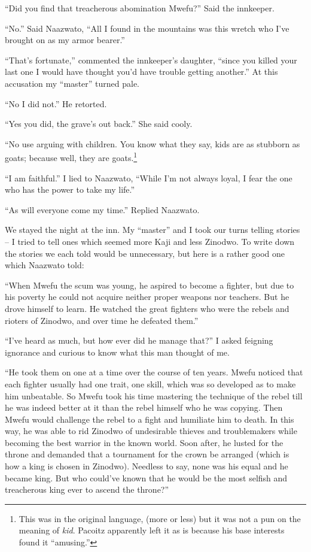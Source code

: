 ``Did you find that treacherous abomination Mwe\-fu?'' Said the innkeeper.

``No.'' Said Naa\-zwa\-to, ``All I found in the mountains was this wretch who I've brought on as my armor bearer.''

``That's fortunate,'' commented the innkeeper's daughter, ``since you killed your last one I would have thought you'd have trouble getting another.'' At this accusation my ``master'' turned pale.

``No I did not.'' He retorted.

``Yes you did, the grave's out back.'' She said cooly.

``No use arguing with children. You know what they say, kids are as stubborn as goats; because well, they are goats.\footnote{This was in the original language, (more or less) but it was not a pun on the meaning of \emph{kid}. Pa\-co\-itz apparently left it as is because his base interests found it ``amusing.''}

``I am faithful.'' I lied to Naa\-zwa\-to, ``While I'm not always loyal, I fear the one who has the power to take my life.''

``As will everyone come my time.'' Replied Naa\-zwa\-to.

We stayed the night at the inn. My ``master'' and I took our turns telling stories -- I tried to tell ones which seemed more Ka\-ji and less Zi\-no\-dwo. To write down the stories we each told would be unnecessary, but here is a rather good one which Naa\-zwa\-to told:

``When Mwe\-fu the scum was young, he aspired to become a fighter, but due to his poverty he could not acquire neither proper weapons nor teachers. But he drove himself to learn. He watched the great fighters who were the rebels and rioters of Zi\-no\-dwo, and over time he defeated them.''

``I've heard as much, but how ever did he manage that?'' I asked feigning ignorance and curious to know what this man thought of me.

``He took them on one at a time over the course of ten years. Mwe\-fu noticed that each fighter usually had one trait, one skill, which was so developed as to make him unbeatable. So Mwe\-fu took his time mastering the technique of the rebel till he was indeed better at it than the rebel himself who he was copying.
Then Mwe\-fu would challenge the rebel to a fight and humiliate him to death. In this way, he was able to rid Zi\-no\-dwo of undesirable thieves and troublemakers while becoming the best warrior in the known world. Soon after, he lusted for the throne and demanded that a tournament for the crown be arranged (which is how a king is chosen in Zi\-no\-dwo). Needless to say, none was his equal and he became king. But who could've known that he would be the most selfish and treacherous king ever to ascend the throne?''

